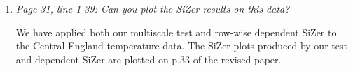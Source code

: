 \documentclass[a4paper,12pt]{article}
\begin{document}
\begin{enumerate}[label=(\arabic*),leftmargin=0.7cm]
\item \textit{Page 31, line 1-39: Can you plot the SiZer results on this data?}

We have applied both our multiscale test and row-wise dependent SiZer to the Central England temperature data. The SiZer plots produced by our test and dependent SiZer are plotted on p.33 of the revised paper.  

\end{enumerate}



\newpage

{\small
\setlength{\bibsep}{0.45em}
}
\end{document}
